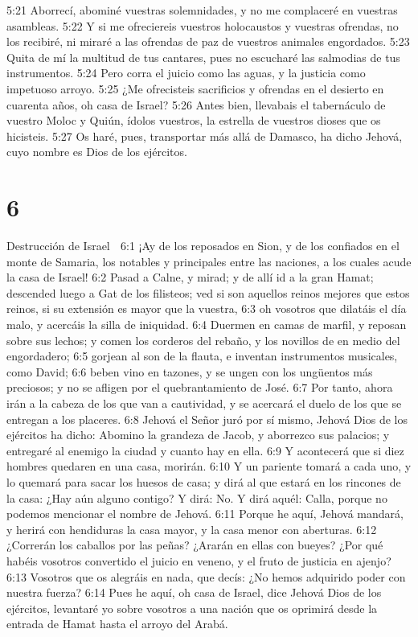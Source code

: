 5:21 Aborrecí, abominé vuestras solemnidades, y no me complaceré en vuestras asambleas.  
5:22 Y si me ofreciereis vuestros holocaustos y vuestras ofrendas, no los recibiré, ni miraré a las ofrendas de paz de vuestros animales engordados. 
5:23 Quita de mí la multitud de tus cantares, pues no escucharé las salmodias de tus instrumentos.  
5:24 Pero corra el juicio como las aguas, y la justicia como impetuoso arroyo.  
5:25 ¿Me ofrecisteis sacrificios y ofrendas en el desierto en cuarenta años, oh casa de Israel?  
5:26 Antes bien, llevabais el tabernáculo de vuestro Moloc y Quiún, ídolos vuestros, la estrella de vuestros dioses que os hicisteis.  
5:27 Os haré, pues, transportar más allá de Damasco, ha dicho Jehová, cuyo nombre es Dios de los ejércitos.  

\chapter{6}

Destrucción de Israel  

6:1 ¡Ay de los reposados en Sion, y de los confiados en el monte de Samaria, los notables y principales entre las naciones, a los cuales acude la casa de Israel!  
6:2 Pasad a Calne, y mirad; y de allí id a la gran Hamat; descended luego a Gat de los filisteos; ved si son aquellos reinos mejores que estos reinos, si su extensión es mayor que la vuestra,  
6:3 oh vosotros que dilatáis el día malo, y acercáis la silla de iniquidad.  
6:4 Duermen en camas de marfil, y reposan sobre sus lechos; y comen los corderos del rebaño, y los novillos de en medio del engordadero;  
6:5 gorjean al son de la flauta, e inventan instrumentos musicales, como David;  
6:6 beben vino en tazones, y se ungen con los ungüentos más preciosos; y no se afligen por el quebrantamiento de José.  
6:7 Por tanto, ahora irán a la cabeza de los que van a cautividad, y se acercará el duelo de los que se entregan a los placeres.  
6:8 Jehová el Señor juró por sí mismo, Jehová Dios de los ejércitos ha dicho: Abomino la grandeza de Jacob, y aborrezco sus palacios; y entregaré al enemigo la ciudad y cuanto hay en ella.  
6:9 Y acontecerá que si diez hombres quedaren en una casa, morirán.  
6:10 Y un pariente tomará a cada uno, y lo quemará para sacar los huesos de casa; y dirá al que estará en los rincones de la casa: ¿Hay aún alguno contigo? Y dirá: No. Y dirá aquél: Calla, porque no podemos mencionar el nombre de Jehová.  
6:11 Porque he aquí, Jehová mandará, y herirá con hendiduras la casa mayor, y la casa menor con aberturas.  
6:12 ¿Correrán los caballos por las peñas? ¿Ararán en ellas con bueyes? ¿Por qué habéis vosotros convertido el juicio en veneno, y el fruto de justicia en ajenjo?  
6:13 Vosotros que os alegráis en nada, que decís: ¿No hemos adquirido poder con nuestra fuerza?  
6:14 Pues he aquí, oh casa de Israel, dice Jehová Dios de los ejércitos, levantaré yo sobre vosotros a una nación que os oprimirá desde la entrada de Hamat hasta el arroyo del Arabá.  

